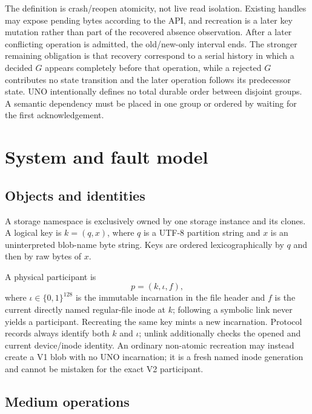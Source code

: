 \documentclass[10pt,twocolumn]{article}
\theoremstyle{remark}
\newcommand{\inc}{\iota}
\begin{document}
The definition is crash/reopen atomicity, not live read isolation. Existing handles may expose
pending bytes according to the API, and recreation is a later key mutation rather than part of the
recovered absence observation. After a later conflicting operation is admitted, the old/new-only
interval ends. The stronger remaining obligation is that recovery correspond to a serial history in
which a decided $G$ appears completely before that operation, while a rejected $G$ contributes no
state transition and the later operation follows its predecessor state. UNO intentionally defines
no total durable order between disjoint groups. A semantic dependency must be placed in one group or
ordered by waiting for the first acknowledgement.

\section{System and fault model}

\subsection{Objects and identities}

A storage namespace is exclusively owned by one storage instance and its clones. A logical key is
$k=(q,x)$, where $q$ is a UTF-8 partition string and $x$ is an uninterpreted blob-name byte string.
Keys are ordered lexicographically by $q$ and then by raw bytes of $x$.

A physical participant is
\[
  p=(k,\inc,f),
\]
where $\inc\in\{0,1\}^{128}$ is the immutable incarnation in the file header and $f$ is the current
directly named regular-file inode at $k$; following a symbolic link never yields a participant.
Recreating the same key mints a new incarnation. Protocol records always identify
both $k$ and $\inc$; unlink additionally checks the opened and current device/inode identity.
An ordinary non-atomic recreation may instead create a V1 blob with no UNO incarnation; it is a
fresh named inode generation and cannot be mistaken for the exact V2 participant.

\subsection{Medium operations}
\end{document}
